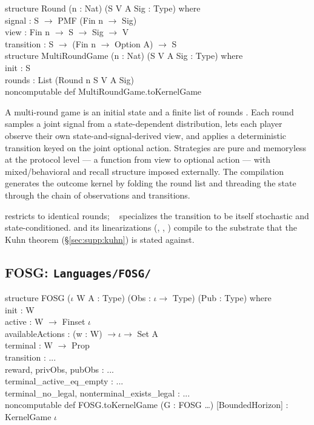 \begin{leanbox}
structure Round (n : Nat) (S V A Sig : Type) where\\
\bd signal     : S $\to$ PMF (Fin n $\to$ Sig)\\
\bd view       : Fin n $\to$ S $\to$ Sig $\to$ V\\
\bd transition : S $\to$ (Fin n $\to$ Option A) $\to$ S\\[3pt]
structure MultiRoundGame (n : Nat) (S V A Sig : Type) where\\
\bd init   : S\\
\bd rounds : List (Round n S V A Sig)\\[3pt]
noncomputable def MultiRoundGame.toKernelGame
\end{leanbox}

\Mathematical
A multi-round game is an initial state and a finite list of rounds
\citep{ShohamLeytonBrown2008}.  Each round samples a joint signal
from a state-dependent distribution, lets each player observe their
own state-and-signal-derived view, and applies a deterministic
transition keyed on the joint optional action.  Strategies are pure
and memoryless at the protocol level — a function from view to
optional action — with mixed/behavioral and recall structure
imposed externally.  The compilation generates the outcome kernel
by folding the round list and threading the state through the
chain of observations and transitions.

\Variants
{} restricts to identical
rounds; ~\citep{Shapley1953stochastic}
specializes the transition to be itself stochastic and
state-conditioned.   and its linearizations
(, ,
) compile to the
 substrate that the Kuhn theorem
(\S\ref{sec:supp:kuhn}) is stated against.

\subsection{FOSG: \texttt{Languages/FOSG/}}
\label{sec:supp:fosg}\label{def:FOSG}

\begin{leanbox}
structure FOSG ($\iota$ W A : Type) (Obs : $\iota \to$ Type) (Pub : Type) where\\
\bd init             : W\\
\bd active           : W $\to$ Finset $\iota$\\
\bd availableActions : (w : W) $\to \iota \to$ Set A\\
\bd terminal         : W $\to$ Prop\\
\bd transition       : ...\\
\bd reward, privObs, pubObs : ...\\
\bd terminal\_active\_eq\_empty : ...\\
\bd terminal\_no\_legal, nonterminal\_exists\_legal : ...\\[3pt]
noncomputable def FOSG.toKernelGame (G : FOSG \dots) [BoundedHorizon] : KernelGame $\iota$
\end{leanbox}

